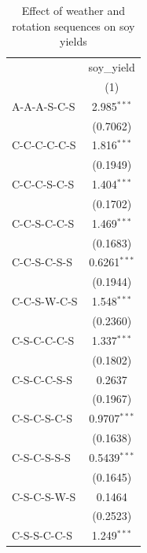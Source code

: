
\begin{table}[H]
   \caption{\label{tab:soy_rot_vpd} Effect of weather and rotation sequences on soy yields}
   \bigskip
   \centering
   \begin{tabular}{lc}
      \toprule
                                      & soy\_yield\\   
                                      & (1)\\  
      \midrule 
      A-A-A-S-C-S                     & 2.985$^{***}$\\   
                                      & (0.7062)\\   
      C-C-C-C-C-S                     & 1.816$^{***}$\\   
                                      & (0.1949)\\   
      C-C-C-S-C-S                     & 1.404$^{***}$\\   
                                      & (0.1702)\\   
      C-C-S-C-C-S                     & 1.469$^{***}$\\   
                                      & (0.1683)\\   
      C-C-S-C-S-S                     & 0.6261$^{***}$\\   
                                      & (0.1944)\\   
      C-C-S-W-C-S                     & 1.548$^{***}$\\   
                                      & (0.2360)\\   
      C-S-C-C-C-S                     & 1.337$^{***}$\\   
                                      & (0.1802)\\   
      C-S-C-C-S-S                     & 0.2637\\   
                                      & (0.1967)\\   
      C-S-C-S-C-S                     & 0.9707$^{***}$\\   
                                      & (0.1638)\\   
      C-S-C-S-S-S                     & 0.5439$^{***}$\\   
                                      & (0.1645)\\   
      C-S-C-S-W-S                     & 0.1464\\   
                                      & (0.2523)\\   
      C-S-S-C-C-S                     & 1.249$^{***}$\\   

\end{tabular}
\end{table}
